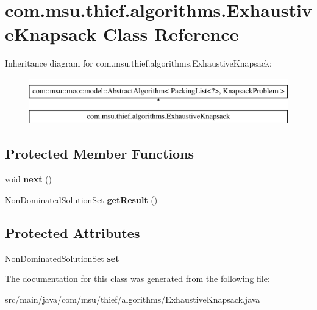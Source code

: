 \hypertarget{classcom_1_1msu_1_1thief_1_1algorithms_1_1ExhaustiveKnapsack}{\section{com.\-msu.\-thief.\-algorithms.\-Exhaustive\-Knapsack Class Reference}
\label{classcom_1_1msu_1_1thief_1_1algorithms_1_1ExhaustiveKnapsack}
}
Inheritance diagram for com.\-msu.\-thief.\-algorithms.\-Exhaustive\-Knapsack\-:\begin{figure}[H]
\begin{center}
\leavevmode
\includegraphics[height=2.000000cm]{classcom_1_1msu_1_1thief_1_1algorithms_1_1ExhaustiveKnapsack}
\end{center}
\end{figure}
\subsection*{Protected Member Functions}
\begin{DoxyCompactItemize}
\item 
\hypertarget{classcom_1_1msu_1_1thief_1_1algorithms_1_1ExhaustiveKnapsack_acf066c1e772d9a05b1530d9107fb4b02}{void {\bfseries next} ()}\label{classcom_1_1msu_1_1thief_1_1algorithms_1_1ExhaustiveKnapsack_acf066c1e772d9a05b1530d9107fb4b02}

\item 
\hypertarget{classcom_1_1msu_1_1thief_1_1algorithms_1_1ExhaustiveKnapsack_ae333b319b4e46506d8215e3be823de68}{Non\-Dominated\-Solution\-Set {\bfseries get\-Result} ()}\label{classcom_1_1msu_1_1thief_1_1algorithms_1_1ExhaustiveKnapsack_ae333b319b4e46506d8215e3be823de68}

\end{DoxyCompactItemize}
\subsection*{Protected Attributes}
\begin{DoxyCompactItemize}
\item 
\hypertarget{classcom_1_1msu_1_1thief_1_1algorithms_1_1ExhaustiveKnapsack_a0f39a710461d6fa8fdcc9523ad12d690}{Non\-Dominated\-Solution\-Set {\bfseries set}}\label{classcom_1_1msu_1_1thief_1_1algorithms_1_1ExhaustiveKnapsack_a0f39a710461d6fa8fdcc9523ad12d690}

\end{DoxyCompactItemize}


The documentation for this class was generated from the following file\-:\begin{DoxyCompactItemize}
\item 
src/main/java/com/msu/thief/algorithms/Exhaustive\-Knapsack.\-java\end{DoxyCompactItemize}
